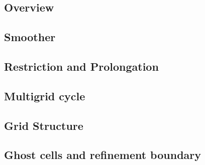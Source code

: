 \subsection{Overview} %
\label{section3.1.1}

\subsection{Smoother} %
\label{section3.1.2}

\subsection{Restriction and Prolongation} %
\label{section3.1.3}

\subsection{Multigrid cycle} %
\label{section3.1.4}

\subsection{Grid Structure} %
\label{section3.1.5}

\subsection{Ghost cells and refinement boundary} %
